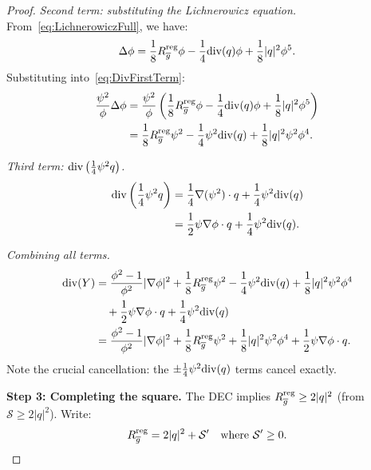 \begin{proof}
\textit{Second term: substituting the Lichnerowicz equation.}
From~\eqref{eq:LichnerowiczFull}, we have:
\begin{equation}\label{eq:LaplacianPhi}
    \Delta \phi = \frac{1}{8} R_{\overline{g}}^{\mathrm{reg}} \phi - \frac{1}{4} \mathrm{div}(q) \phi + \frac{1}{8} |q|^2 \phi^5.
\end{equation}
Substituting into~\eqref{eq:DivFirstTerm}:
\begin{align}
    \frac{\psi^2}{\phi} \Delta \phi &= \frac{\psi^2}{\phi} \left( \frac{1}{8} R_{\overline{g}}^{\mathrm{reg}} \phi - \frac{1}{4} \mathrm{div}(q) \phi + \frac{1}{8} |q|^2 \phi^5 \right) \nonumber\\
    &= \frac{1}{8} R_{\overline{g}}^{\mathrm{reg}} \psi^2 - \frac{1}{4} \psi^2 \mathrm{div}(q) + \frac{1}{8} |q|^2 \psi^2 \phi^4. \label{eq:SecondTermExpanded}
\end{align}

\textit{Third term: $\mathrm{div}\left(\frac{1}{4} \psi^2 q\right)$.}
\begin{align}
    \mathrm{div}\left(\frac{1}{4} \psi^2 q\right) &= \frac{1}{4} \nabla(\psi^2) \cdot q + \frac{1}{4} \psi^2 \mathrm{div}(q) \nonumber\\
    &= \frac{1}{2} \psi \nabla \phi \cdot q + \frac{1}{4} \psi^2 \mathrm{div}(q). \label{eq:ThirdTermExpanded}
\end{align}

\textit{Combining all terms.}
\begin{align}
    \mathrm{div}(Y) &= \frac{\phi^2 - 1}{\phi^2} |\nabla \phi|^2 + \frac{1}{8} R_{\overline{g}}^{\mathrm{reg}} \psi^2 - \frac{1}{4} \psi^2 \mathrm{div}(q) + \frac{1}{8} |q|^2 \psi^2 \phi^4 \nonumber\\
    &\quad + \frac{1}{2} \psi \nabla \phi \cdot q + \frac{1}{4} \psi^2 \mathrm{div}(q) \nonumber\\
    &= \frac{\phi^2 - 1}{\phi^2} |\nabla \phi|^2 + \frac{1}{8} R_{\overline{g}}^{\mathrm{reg}} \psi^2 + \frac{1}{8} |q|^2 \psi^2 \phi^4 + \frac{1}{2} \psi \nabla \phi \cdot q. \label{eq:DivYCombined}
\end{align}
Note the crucial cancellation: the $\pm \frac{1}{4} \psi^2 \mathrm{div}(q)$ terms cancel exactly.

\textbf{Step 3: Completing the square.}
The DEC implies $R_{\overline{g}}^{\mathrm{reg}} \ge 2|q|^2$ (from $\mathcal{S} \ge 2|q|^2$). Write:
\begin{equation}\label{eq:ScalarDecomp-deriv}
    R_{\overline{g}}^{\mathrm{reg}} = 2|q|^2 + \mathcal{S}' \quad \text{where } \mathcal{S}' \ge 0.
\end{equation}


\end{proof}
